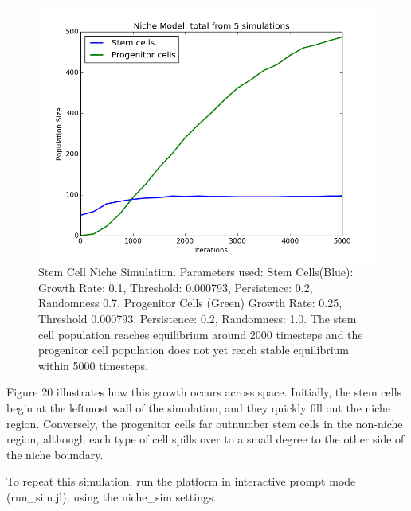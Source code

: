\documentclass[12pt]{article}
\begin{document}
\begin{figure}[H]
\centering
\includegraphics[width=13.51cm]{media/pops.png}
\caption{Stem Cell Niche Simulation. Parameters used: Stem Cells(Blue): Growth Rate: 0.1, Threshold: 0.000793, 
  Persistence: 0.2, Randomness 0.7. Progenitor Cells (Green) Growth Rate: 0.25, Threshold 0.000793, Persistence: 
  0.2, Randomness: 1.0. The stem cell population reaches equilibrium around 2000 timesteps and the progenitor 
cell population does not yet reach stable equilibrium within 5000 timesteps.}
\end{figure}

Figure 20 illustrates how this growth occurs across space.
Initially, the stem cells begin at the leftmost wall of the simulation, 
and they quickly fill out the niche region. Conversely, the progenitor 
cells far outnumber stem cells in the non-niche region, although each 
type of cell spills over to a small degree to the other side of the 
niche boundary.

To repeat this simulation, run the platform in interactive prompt mode 
(run\_sim.jl), using the niche\_sim settings.
\end{document}
